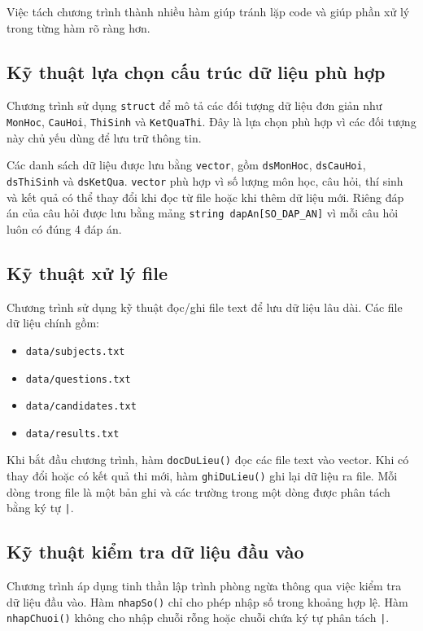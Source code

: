 \documentclass[12pt,a4paper]{report}
\begin{document}
Việc tách chương trình thành nhiều hàm giúp tránh lặp code và giúp phần xử lý trong từng hàm rõ ràng hơn.

\subsection{Kỹ thuật lựa chọn cấu trúc dữ liệu phù hợp}

Chương trình sử dụng \texttt{struct} để mô tả các đối tượng dữ liệu đơn giản như \texttt{MonHoc}, \texttt{CauHoi}, \texttt{ThiSinh} và \texttt{KetQuaThi}. Đây là lựa chọn phù hợp vì các đối tượng này chủ yếu dùng để lưu trữ thông tin.

Các danh sách dữ liệu được lưu bằng \texttt{vector}, gồm \texttt{dsMonHoc}, \texttt{dsCauHoi}, \texttt{dsThiSinh} và \texttt{dsKetQua}. \texttt{vector} phù hợp vì số lượng môn học, câu hỏi, thí sinh và kết quả có thể thay đổi khi đọc từ file hoặc khi thêm dữ liệu mới. Riêng đáp án của câu hỏi được lưu bằng mảng \texttt{string dapAn[SO\_DAP\_AN]} vì mỗi câu hỏi luôn có đúng 4 đáp án.

\subsection{Kỹ thuật xử lý file}

Chương trình sử dụng kỹ thuật đọc/ghi file text để lưu dữ liệu lâu dài. Các file dữ liệu chính gồm:

\begin{itemize}
    \item \texttt{data/subjects.txt}
    \item \texttt{data/questions.txt}
    \item \texttt{data/candidates.txt}
    \item \texttt{data/results.txt}
\end{itemize}

Khi bắt đầu chương trình, hàm \texttt{docDuLieu()} đọc các file text vào vector. Khi có thay đổi hoặc có kết quả thi mới, hàm \texttt{ghiDuLieu()} ghi lại dữ liệu ra file. Mỗi dòng trong file là một bản ghi và các trường trong một dòng được phân tách bằng ký tự \texttt{|}.

\subsection{Kỹ thuật kiểm tra dữ liệu đầu vào}

Chương trình áp dụng tinh thần lập trình phòng ngừa thông qua việc kiểm tra dữ liệu đầu vào. Hàm \texttt{nhapSo()} chỉ cho phép nhập số trong khoảng hợp lệ. Hàm \texttt{nhapChuoi()} không cho nhập chuỗi rỗng hoặc chuỗi chứa ký tự phân tách \texttt{|}.
\end{document}
